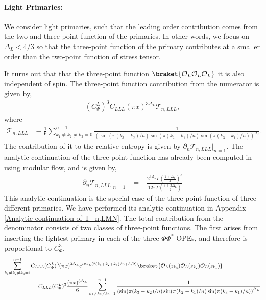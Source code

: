 \documentclass[11pt]{article}
\newcommand{\p}{\partial}
\newcommand{\mO}{\mathcal{O}}
\newcommand{\lb}{\left(}
\newcommand{\rb}{\right)}
\begin{document}
\paragraph{Light Primaries:} We consider light primaries, such that the leading order contribution comes from the two and three-point function of the primaries. In other words, we focus on $\Delta_L<4/3$ so that the three-point function of the primary contributes at a smaller order than the two-point function of stress tensor. 

It turns out that that the three-point function $\braket{\mO_L\mO_L\mO_L}$ it is also independent of spin.
The three-point function contribution from the numerator is given by,
\begin{align}
    (C^L_{\Psi})^3C_{LLL}(\pi x)^{3\Delta_L}\mathcal{T}_{n,LLL},
\end{align}
where
\begin{align}
     \mathcal{T}_{n,LLL} &\equiv \frac{1}{6}\sum_{k_1\neq k_2\neq k_3 =0}^{n-1} \frac{1}{\lb \sin(\pi (k_3 - k_2)/n) \sin (\pi (k_2 - k_1)/n) \sin(\pi (k_3-k_1)/n)\rb^{\Delta_L}}.
\end{align}
The contribution of it to the relative entropy is given by $\p_n \mathcal{T}_{n,LLL}|_{n=1}$. The analytic continuation of the three-point function has already been computed in \cite{S_rosi_2018} using modular flow, and is given by,
\begin{align}
    \p_n\mathcal{T}_{n,LLL}|_{n=1} &= -\frac{2^{3\Delta_L}\Gamma \lb\frac{1+\Delta_L}{2}\rb^3}{12\pi \Gamma\lb\frac{3+3\Delta_L}{2}\rb}
\end{align}
This analytic continuation is the special case of the three-point function of three different primaries. We have performed its analytic continuation in Appendix \ref{Analytic continuation of T_n,LMN}. 
The total contribution from the denominator consists of two classes of three-point functions. The first arises from inserting the lightest primary in each of the three $\Phi \Phi^*$ OPEs, and therefore is proportional to $C_\Phi^3$. 
  \begin{align}
     \sum_{k_1 \neq k_2 \neq k_3 = 1}^{n-1} &C_{LLL}(C^L_{\Phi})^3(\pi x)^{3\Delta_L} e^{i\pi s_L(2(k_1 + k_2+k_3)/n + 3/2) }\braket{ \mO_L(z_{k_3})\mO_L(z_{k_2})\mO_L(z_{k_1})} \\
            & = C_{LLL}(C^L_{\Phi})^3\frac{(\pi x)^{3\Delta_L}}{6}\sum_{k_1 \neq k_2 \neq k_3= 1}^{n-1}\frac{1}{\lb \sin(\pi (k_3 - k_2)/n) \sin (\pi (k_2 - k_1)/n) \sin(\pi (k_3-k_1)/n)\rb^{\Delta_L}}
  \end{align}
\end{document}
